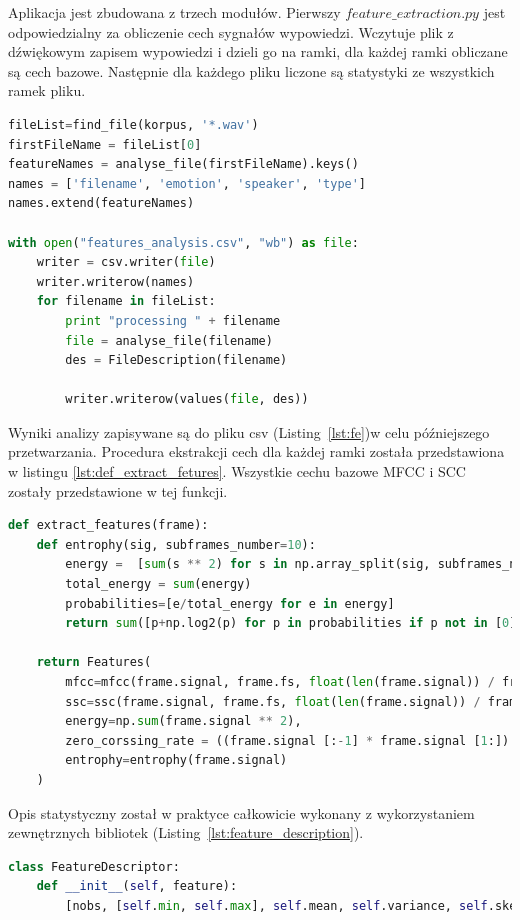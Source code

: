 \documentclass[a4paper,12pt,twoside,openany]{report}
\newcommand{\Lst}[1]{(Listing~\ref{#1})}
\begin{document}
Aplikacja jest zbudowana z trzech modułów.
Pierwszy $feature\_extraction.py$ jest odpowiedzialny za obliczenie cech sygnałów wypowiedzi. 
Wczytuje plik z dźwiękowym zapisem wypowiedzi i dzieli go na ramki, 
dla każdej ramki obliczane są cech bazowe.
Następnie dla każdego pliku liczone są statystyki ze wszystkich ramek pliku.
\begin{lstlisting}[language=python,caption={Program obliczający cechy wypowiedzi},label={lst:fe}]
fileList=find_file(korpus, '*.wav')
firstFileName = fileList[0]
featureNames = analyse_file(firstFileName).keys()
names = ['filename', 'emotion', 'speaker', 'type']
names.extend(featureNames)

with open("features_analysis.csv", "wb") as file:
    writer = csv.writer(file)
    writer.writerow(names)
    for filename in fileList:
        print "processing " + filename
        file = analyse_file(filename)
        des = FileDescription(filename)

        writer.writerow(values(file, des))	
\end{lstlisting}
Wyniki analizy zapisywane są do pliku csv \Lst{lst:fe}w celu późniejszego przetwarzania.
Procedura ekstrakcji cech dla każdej ramki została przedstawiona w listingu \ref{lst:def_extract_fetures}.
Wszystkie cechu bazowe MFCC i SCC zostały przedstawione w tej funkcji.
\begin{lstlisting}[language=python,caption={Ekstrakcja cech wypowiedzi},label={lst:def_extract_fetures}]
def extract_features(frame):
    def entrophy(sig, subframes_number=10):
        energy =  [sum(s ** 2) for s in np.array_split(sig, subframes_number)]
        total_energy = sum(energy)
        probabilities=[e/total_energy for e in energy]
        return sum([p+np.log2(p) for p in probabilities if p not in [0]])

    return Features(
        mfcc=mfcc(frame.signal, frame.fs, float(len(frame.signal)) / frame.fs, winfunc=np.hamming)[0],
        ssc=ssc(frame.signal, frame.fs, float(len(frame.signal)) / frame.fs, winfunc=np.hamming)[0],
        energy=np.sum(frame.signal ** 2),
        zero_corssing_rate = ((frame.signal [:-1] * frame.signal [1:]) < 0).sum(),
        entrophy=entrophy(frame.signal)
    )
\end{lstlisting}
Opis statystyczny został w praktyce całkowicie wykonany z wykorzystaniem zewnętrznych bibliotek \Lst{lst:feature_description}. 
\begin{lstlisting}[language=python,caption={Opis statystyczny cech},label={lst:feature_description}]
class FeatureDescriptor:
    def __init__(self, feature):
        [nobs, [self.min, self.max], self.mean, self.variance, self.skewness, self.kurtosis] = stats.describe(feature)
\end{lstlisting}
\end{document}
